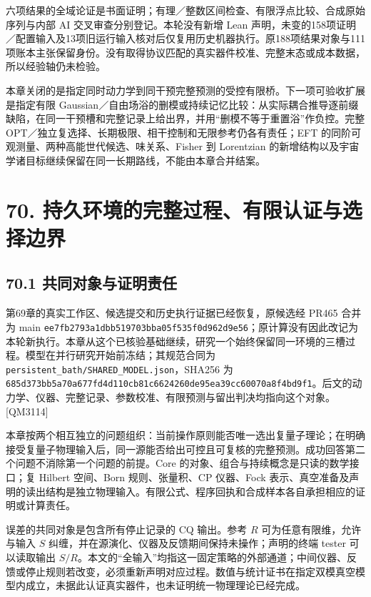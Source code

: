 \documentclass[
  11pt,
  oneside]{book}
\begin{document}
六项结果的全域论证是书面证明；有理／整数区间检查、有限浮点比较、合成原始序列与内部
AI 交叉审查分别登记。本轮没有新增 Lean
声明，未变的158项证明／配置输入及13项旧运行输入核对后仅复用历史机器执行。原188项结果对象与111项账本主张保留身份。没有取得协议匹配的真实器件校准、完整末态或成本数据，所以经验轴仍未检验。

本章关闭的是指定同时动力学到同干预完整预测的受控有限桥。下一项可验收扩展是指定有限
Gaussian／自由场浴的删模或持续记忆比较：从实际耦合推导逐前缀缺陷，在同一干预槽和完整记录上给出界，并用``删模不等于重置浴''作负控。完整
OPT／独立复选择、长期极限、相干控制和无限参考仍各有责任；EFT
的同阶可观测量、两种高能世代候选、味关系、Fisher 到 Lorentzian
的新增结构以及宇宙学诸目标继续保留在同一长期路线，不能由本章合并结案。

\chapter{70. 持久环境的完整过程、有限认证与选择边界}\label{ch-70}\hypertarget{ch-70}{}

\section{70.1 共同对象与证明责任}

第69章的真实工作区、候选提交和历史执行证据已经恢复，原候选经 PR465
合并为 main
\texttt{ee7fb2793a1d\allowbreak bb519703bba0\allowbreak 5f535f0d962d\allowbreak 9e56}；原计算没有因此改记为本轮新执行。本章从这个已核验基础继续，研究一个始终保留同一环境的三槽过程。模型在并行研究开始前冻结；其规范合同为
\texttt{persistent\_\allowbreak bath/\allowbreak SHARED\_\allowbreak MODEL.\allowbreak json}，SHA256 为
\texttt{685d373bb5a7\allowbreak 0a677fd4d110\allowbreak cb81c6624260\allowbreak de95ea39cc60\allowbreak 070a8f4bd9f1}。后文的动力学、仪器、完整记录、参数校准、有限预测与留出判决均指向这个对象。{[}QM3114{]}

本章按两个相互独立的问题组织：当前操作原则能否唯一选出复量子理论；在明确接受复量子物理输入后，同一源能否给出可控且可复核的完整预测。成功回答第二个问题不消除第一个问题的前提。Core
的对象、组合与持续概念是只读的数学接口；复 Hilbert 空间、Born
规则、张量积、CP 仪器、Fock
表示、真空准备及声明的读出结构是独立物理输入。有限公式、程序回执和合成样本各自承担相应的证明或计算责任。

误差的共同对象是包含所有停止记录的 CQ 输出。参考 \(R\)
可为任意有限维，允许与输入 \(S\)
纠缠，并在源演化、仪器及反馈期间保持未操作；声明的终端 tester
可以读取输出
\(S/R\)。本文的``全输入''均指这一固定策略的外部通道；中间仪器、反馈或停止规则若改变，必须重新声明对应过程。数值与统计证书在指定双模真空模型内成立，未据此认证真实器件，也未证明统一物理理论已经完成。
\end{document}
